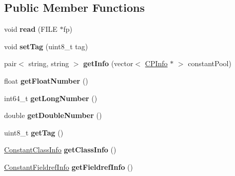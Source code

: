 \subsection*{Public Member Functions}
\begin{DoxyCompactItemize}
\item 
void {\bfseries read} (F\+I\+LE $\ast$fp)\hypertarget{classCPInfo_ab5fffd0d4433673806891f92edd67826}{}\label{classCPInfo_ab5fffd0d4433673806891f92edd67826}

\item 
void {\bfseries set\+Tag} (uint8\+\_\+t tag)\hypertarget{classCPInfo_aaa647d37b2b238aafcacddd027aeafe8}{}\label{classCPInfo_aaa647d37b2b238aafcacddd027aeafe8}

\item 
pair$<$ string, string $>$ {\bfseries get\+Info} (vector$<$ \hyperlink{classCPInfo}{C\+P\+Info} $\ast$ $>$ constant\+Pool)\hypertarget{classCPInfo_a331977da199d8fa56995f9de3bcb837b}{}\label{classCPInfo_a331977da199d8fa56995f9de3bcb837b}

\item 
float {\bfseries get\+Float\+Number} ()\hypertarget{classCPInfo_ab1f2f8f848bcc2fec287a243ee19ee69}{}\label{classCPInfo_ab1f2f8f848bcc2fec287a243ee19ee69}

\item 
int64\+\_\+t {\bfseries get\+Long\+Number} ()\hypertarget{classCPInfo_adec66ffc8ee4a552223e7b232a1ab5c1}{}\label{classCPInfo_adec66ffc8ee4a552223e7b232a1ab5c1}

\item 
double {\bfseries get\+Double\+Number} ()\hypertarget{classCPInfo_a65f562eac59444e0571e665f0af4bfc4}{}\label{classCPInfo_a65f562eac59444e0571e665f0af4bfc4}

\item 
uint8\+\_\+t {\bfseries get\+Tag} ()\hypertarget{classCPInfo_abea4ee7bf02eec0d9d5b86fc90f024f1}{}\label{classCPInfo_abea4ee7bf02eec0d9d5b86fc90f024f1}

\item 
\hyperlink{structConstantClassInfo}{Constant\+Class\+Info} {\bfseries get\+Class\+Info} ()\hypertarget{classCPInfo_a64411575d297ff8b50684ca5b0c93471}{}\label{classCPInfo_a64411575d297ff8b50684ca5b0c93471}

\item 
\hyperlink{structConstantFieldrefInfo}{Constant\+Fieldref\+Info} {\bfseries get\+Fieldref\+Info} ()\hypertarget{classCPInfo_ac671e911cb4b8872bd55d9a5b9f146d9}{}\label{classCPInfo_ac671e911cb4b8872bd55d9a5b9f146d9}


\end{DoxyCompactItemize}
